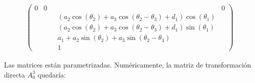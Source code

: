 \documentclass[a4paper,12pt]{article}
\begin{document}
{\begin{align*}
\begin{pmatrix}
        0                                                                          & 0                                                                                                                                                   & 0                                \\
                                                                                   & \qquad \left(a_{2} \cos{\left(\theta_{2} \right)} + a_{3} \cos{\left(\theta_{2} - \theta_{3} \right)} + d_{1}\right) \cos{\left(\theta_{1} \right)}                                    \\
                                                                                   & \qquad \left(a_{2} \cos{\left(\theta_{2} \right)} + a_{3} \cos{\left(\theta_{2} - \theta_{3} \right)} + d_{1}\right) \sin{\left(\theta_{1} \right)}                                    \\
                                                                                   & \qquad a_{1} + a_{2} \sin{\left(\theta_{2} \right)} + a_{3} \sin{\left(\theta_{2} - \theta_{3} \right)}                                                                                \\
                                                                                   & \qquad 1
    \end{pmatrix}
\end{align*}}

\newpage
Las matrices están parametrizadas. Numéricamente, la matriz de transformación directa $A_0^3$ quedaría:
\end{document}
